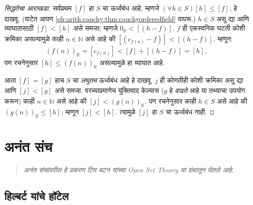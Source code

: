 \documentclass[11pt,a4paper,openany]{book}
\theoremstyle{definition}
\newcommand{\Nat}{\mathbb{N}}
\newcommand{\Real}{\mathbb{R}}
\newcommand{\equivrep}[2]{[#1]_{#2}}
\newenvironment{editorial}{\begin{quote}\small\itshape}{\end{quote}}
\begin{document}
\begin{proof}[सिद्धतेचा आराखडा]
सर्वप्रथम $\equivrep{f}{}$ हा $S$ चा ऊर्ध्वबंध आहे, म्हणजे
$(\forall h \in S)\equivrep{h}{} \leq \equivrep{f}{}$, हे दाखवू.
(वाटेत आपण \ref{sfr:arith:cauchy:thm:cauchyorderedfield} वापरू.) $h \in S$ असू द्या
आणि व्याघातासाठी $\equivrep{f}{} < \equivrep{h}{}$ असे समजा; म्हणजे
$0_\Real < \equivrep{(h-f)}{}$. $f$ ही एकस्वनिक घटती कोशी क्रमिका
असल्यामुळे काही $n \in \Nat$ असे आहे की
$\equivrep{(c_{f(n)} - f)}{} < \equivrep{(h-f)}{}$. म्हणून:
\[
	(f(n))_\Real = \equivrep{c_{f(n)}}{} < \equivrep{f}{} + \equivrep{(h-f)}{} = \equivrep{h}{},
\]
पण रचनेनुसार $\equivrep{h}{} \leq (f(n))_\Real$ असल्यामुळे हा
व्याघात आहे.

आता $\equivrep{f}{} = \equivrep{g}{}$ हाच $S$ चा \emph{लघुतम}
ऊर्ध्वबंध आहे हे दाखवू. $j$ ही कोणतीही कोशी क्रमिका असू द्या आणि
$\equivrep{j}{} < \equivrep{g}{}$ असे समजा. वरच्याप्रमाणेच युक्तिवाद
केल्यास ($g$ हे \emph{वाढते} आहे या तथ्याचा उपयोग करून) काही $n \in
\Nat$ असे आहे की $\equivrep{j}{} < (g(n))_\Real$. पण रचनेनुसार काही
$h \in S$ असे आहे की $(g(n))_\Real \leq \equivrep{h}{}$; म्हणून
$\equivrep{j}{} < \equivrep{h}{}$. त्यामुळे $\equivrep{j}{}$ हा
$S$ चा ऊर्ध्वबंध नाही.
\end{proof}



\chapter{अनंत संच}\label{sfr:infinite::chap}
\begin{editorial}
अनंत संचांवरील हे प्रकरण टिम बटन यांच्या \emph{Open Set Theory}
या ग्रंथातून घेतले आहे.
\end{editorial}




\section{हिल्बर्ट यांचे हॉटेल}\label{sfr:infinite:hilbert:sec}
\end{document}

